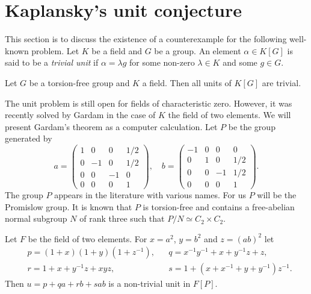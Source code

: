 \section{Kaplansky's unit conjecture}

This section is to discuss the existence of a counterexample
for the following well-known problem. Let $K$ be a field
and $G$ be a group. An element
$\alpha\in K[G]$ is said to be a \emph{trivial unit}
if $\alpha=\lambda g$ for some non-zero $\lambda\in K$ and
some $g\in G$. 

\begin{conjecture}[Kaplansky]
\label{conj:Kaplansky}
Let $G$ be a torsion-free group and $K$ a field. Then 
all units of $K[G]$ are trivial.
\end{conjecture}

The unit problem is still open for fields of characteristic zero.
However, it was recently solved by Gardam \cite{MR4334981}
in the case of
$K$ the field of two elements. We will present Gardam's theorem
as a computer calculation.
Let $P$ be the group
generated by
\[
a=\begin{pmatrix}
1 & 0 & 0 & 1/2\\
0 & -1 & 0 & 1/2\\
0 & 0 & -1 & 0\\
0 & 0 & 0 & 1
\end{pmatrix},
\quad
b=\begin{pmatrix}
-1 & 0 & 0 & 0\\
0 & 1 & 0 & 1/2\\
0 & 0 & -1 & 1/2\\
0 & 0 & 0 & 1
\end{pmatrix}.
\]
The group $P$ appears in the literature with various names.
For us $P$ will be the Promislow group. It is known
that $P$ is torsion-free and contains 
a free-abelian normal subgroup $N$ of rank three
such that $P/N\simeq C_2\times C_2$. 

\begin{theorem}[Gardam]
    Let $F$ be the field of two elements. For
    $x=a^2$, $y=b^2$ and $z=(ab)^2$ let
    \begin{align*}
        &p=(1+x)(1+y)(1+z^{-1}),
        &&q = x^{-1}y^{-1}+x+y^{-1}z+z,\\
        &r = 1+x+y^{-1}z+xyz,
        &&s=1+(x+x^{-1}+y+y^{-1})z^{-1}.
    \end{align*}
    Then $u=p+qa+rb+sab$ is a non-trivial unit in $F[P]$.
\end{theorem}

